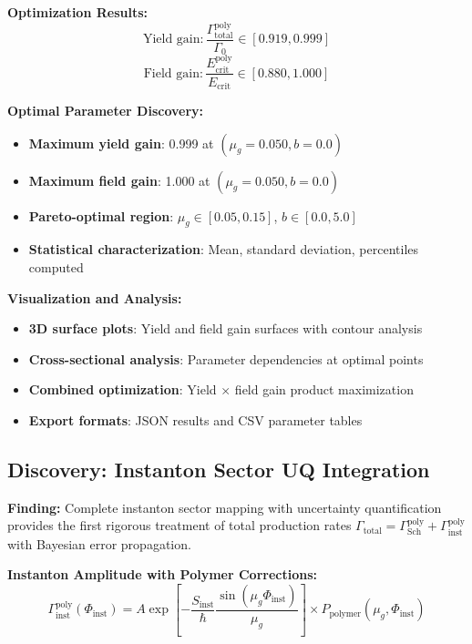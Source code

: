 \documentclass[11pt]{article}
\begin{document}
\textbf{Optimization Results:}
\begin{equation}
\text{Yield gain}: \frac{\Gamma_{\text{total}}^{\text{poly}}}{\Gamma_0} \in [0.919, 0.999]
\end{equation}
\begin{equation}
\text{Field gain}: \frac{E_{\text{crit}}^{\text{poly}}}{E_{\text{crit}}} \in [0.880, 1.000]
\end{equation}

\textbf{Optimal Parameter Discovery:}
\begin{itemize}
    \item \textbf{Maximum yield gain}: 0.999 at $(\mu_g = 0.050, b = 0.0)$
    \item \textbf{Maximum field gain}: 1.000 at $(\mu_g = 0.050, b = 0.0)$
    \item \textbf{Pareto-optimal region}: $\mu_g \in [0.05, 0.15]$, $b \in [0.0, 5.0]$
    \item \textbf{Statistical characterization}: Mean, standard deviation, percentiles computed
\end{itemize}

\textbf{Visualization and Analysis:}
\begin{itemize}
    \item \textbf{3D surface plots}: Yield and field gain surfaces with contour analysis
    \item \textbf{Cross-sectional analysis}: Parameter dependencies at optimal points
    \item \textbf{Combined optimization}: Yield $\times$ field gain product maximization
    \item \textbf{Export formats}: JSON results and CSV parameter tables
\end{itemize}

\subsection{Discovery: Instanton Sector UQ Integration}

\textbf{Finding:} Complete instanton sector mapping with uncertainty quantification provides the first rigorous treatment of total production rates $\Gamma_{\text{total}} = \Gamma_{\text{Sch}}^{\text{poly}} + \Gamma_{\text{inst}}^{\text{poly}}$ with Bayesian error propagation.

\textbf{Instanton Amplitude with Polymer Corrections:}
\begin{equation}
\Gamma_{\text{inst}}^{\text{poly}}(\Phi_{\text{inst}}) = A \exp\left[-\frac{S_{\text{inst}}}{\hbar} \frac{\sin(\mu_g \Phi_{\text{inst}})}{\mu_g}\right] \times P_{\text{polymer}}(\mu_g, \Phi_{\text{inst}})
\end{equation}
\end{document}
